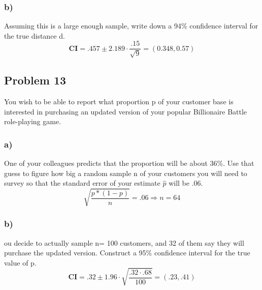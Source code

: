 \documentclass{article}
\begin{document}
\subsubsection*{b)}
Assuming this is a large enough sample, write down a 94\% confidence interval for the true distance d.
\begin{equation}
    \textbf{CI} = .457 \pm 2.189 \cdot\frac{.15}{\sqrt{9}} = (0.348,0.57)
\end{equation}
\subsection*{Problem 13}
You wish to be able to report what proportion p of your customer base is interested in purchasing an updated version of your popular Billionaire Battle role-playing game. 
\subsubsection*{a)}
One of your colleagues predicts that the proportion will be about 36\%. Use that guess to figure how big a random sample n of your customers you will need to survey so that the standard error of your estimate $\hat{p}$ will be .06.
\begin{equation}
    \sqrt{\frac{p*(1-p)}{n}} = .06 \Rightarrow n = 64
\end{equation}
\subsubsection*{b)}
ou decide to actually sample n= 100 customers, and 32 of them say they will purchase the updated version. Construct a 95\% confidence interval for the true value of p.
\begin{equation}
    \textbf{CI} = .32 \pm 1.96\cdot\sqrt{\frac{.32\cdot.68}{100}} = (.23,.41)
\end{equation}
\end{document}
